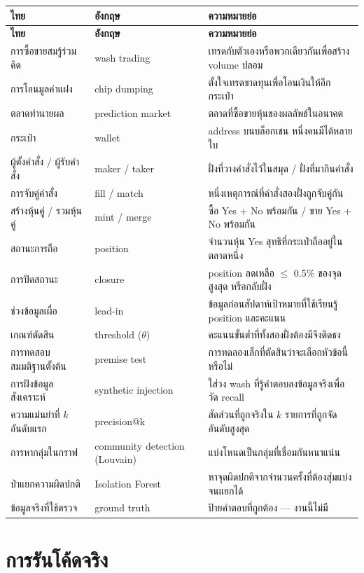\documentclass[11pt,a4paper]{article}
\newcommand{\sansall}{\sffamily}
\newcommand{\thd}[1]{\sansall\bfseries #1}
\begin{document}
\begin{longtable}{L{4.0cm}L{3.8cm}L{6.6cm}}
\toprule
\thd{ไทย} & \thd{อังกฤษ} & \thd{ความหมายย่อ} \\
\midrule
\endfirsthead
\toprule
\thd{ไทย} & \thd{อังกฤษ} & \thd{ความหมายย่อ} \\
\midrule
\endhead
\bottomrule
\endfoot
การซื้อขายสมรู้ร่วมคิด & wash trading & เทรดกับตัวเองหรือพวกเดียวกันเพื่อสร้าง volume ปลอม \\
การโอนมูลค่าแฝง & chip dumping & ตั้งใจเทรดขาดทุนเพื่อโอนเงินให้อีกกระเป๋า \\
ตลาดทำนายผล & prediction market & ตลาดที่ซื้อขายหุ้นของผลลัพธ์ในอนาคต \\
กระเป๋า & wallet & address บนบล็อกเชน หนึ่งคนมีได้หลายใบ \\
ผู้ตั้งคำสั่ง / ผู้รับคำสั่ง & maker / taker & ฝั่งที่วางคำสั่งไว้ในสมุด / ฝั่งที่มากินคำสั่ง \\
การจับคู่คำสั่ง & fill / match & หนึ่งเหตุการณ์ที่คำสั่งสองฝั่งถูกจับคู่กัน \\
สร้างหุ้นคู่ / รวมหุ้นคู่ & mint / merge & ซื้อ Yes + No พร้อมกัน / ขาย Yes + No พร้อมกัน \\
สถานะการถือ & position & จำนวนหุ้น Yes สุทธิที่กระเป๋าถืออยู่ในตลาดหนึ่ง \\
การปิดสถานะ & closure & position ลดเหลือ $\le$ 0.5\% ของจุดสูงสุด หรือกลับฝั่ง \\
ช่วงข้อมูลเผื่อ & lead-in & ข้อมูลก่อนสัปดาห์เป้าหมายที่ใช้เรียนรู้ position และคะแนน \\
เกณฑ์ตัดสิน & threshold ($\theta$) & คะแนนขั้นต่ำที่ทั้งสองฝั่งต้องมีจึงติดธง \\
การทดสอบสมมติฐานตั้งต้น & premise test & การทดลองเล็กที่ตัดสินว่าจะเลือกหัวข้อนี้หรือไม่ \\
การฝังข้อมูลสังเคราะห์ & synthetic injection & ใส่วง wash ที่รู้คำตอบลงข้อมูลจริงเพื่อวัด recall \\
ความแม่นยำที่ $k$ อันดับแรก & precision@k & สัดส่วนที่ถูกจริงใน $k$ รายการที่ถูกจัดอันดับสูงสุด \\
การหากลุ่มในกราฟ & community detection (Louvain) & แบ่งโหนดเป็นกลุ่มที่เชื่อมกันหนาแน่น \\
ป่าแยกความผิดปกติ & Isolation Forest & หาจุดผิดปกติจากจำนวนครั้งที่ต้องสุ่มแบ่งจนแยกได้ \\
ข้อมูลจริงที่ใช้ตรวจ & ground truth & ป้ายคำตอบที่ถูกต้อง --- งานนี้ไม่มี \\
\end{longtable}

\section{การรันโค้ดจริง}
\end{document}
